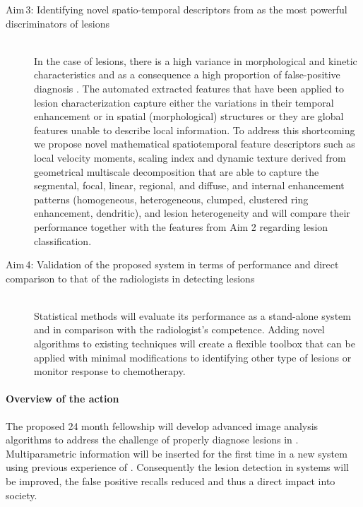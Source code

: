 \begin{description}
  \item [Aim\,3: Identifying novel spatio-temporal descriptors from \cemri as the most powerful discriminators of \nmle lesions]
  \hfill \\

  In the case of \nmle lesions, there is a high variance in morphological and
  kinetic characteristics and as a consequence a high proportion of
  false-positive diagnosis . The automated extracted features
  that have been applied to lesion characterization capture either the
  variations in their temporal enhancement or in spatial (morphological)
  structures or they are global features unable to describe local information.
  To address this shortcoming we propose novel mathematical spatiotemporal
  feature descriptors such as local velocity moments, scaling index and dynamic
  texture derived from geometrical multiscale decomposition that are able to
  capture the segmental, focal, linear, regional, and diffuse, and internal
  enhancement patterns (homogeneous, heterogeneous, clumped, clustered ring
  enhancement, dendritic), and lesion heterogeneity and will compare their
  performance together with the features from Aim 2 regarding lesion
  classification.

  \item [Aim\,4: Validation of the proposed system in terms of performance and direct comparison
to that of the radiologists in detecting lesions]
  \hfill \\

  Statistical methods will evaluate its performance as a stand-alone system and
  in comparison with the radiologist’s competence. Adding novel algorithms to
  existing techniques will create a flexible toolbox that can be applied with
  minimal modifications to identifying other type of lesions or monitor
  response to chemotherapy.

\end{description}

\paragraph{Overview of the action}

The proposed 24 month fellowship will develop advanced image analysis algorithms to address the challenge of properly diagnose \nmle lesions in \mri.
Multiparametric \mri information will be inserted for the first time in a new \cad system using previous experience of \vicorob. Consequently the lesion detection in \cad systems will be improved, the false positive recalls reduced and thus a direct impact into society.

